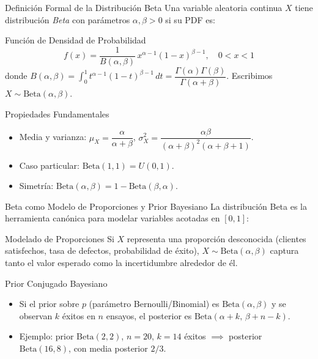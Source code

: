 \documentclass[10pt, aspectratio=169]{beamer}
\begin{document}
\begin{frame}{Definición Formal de la Distribución Beta}
  \footnotesize
  Una variable aleatoria continua $X$ tiene distribución \emph{Beta} con parámetros $\alpha, \beta > 0$ si su PDF es: \pause

  \vspace{0.1cm}
  \begin{block}{Función de Densidad de Probabilidad}
    $$f(x) = \dfrac{1}{B(\alpha,\beta)}\,x^{\alpha-1}(1-x)^{\beta-1}, \quad 0 < x < 1$$
    donde $B(\alpha,\beta) = \int_{0}^{1} t^{\alpha-1}(1-t)^{\beta-1}\,dt = \dfrac{\Gamma(\alpha)\Gamma(\beta)}{\Gamma(\alpha+\beta)}$. Escribimos $X \sim \text{Beta}(\alpha,\beta)$.
  \end{block}

  \vspace{0.1cm}
  \pause
  \begin{alertblock}{Propiedades Fundamentales}
    \begin{itemize}\itemsep=0.05cm
      \item Media y varianza: $\mu_{X} = \dfrac{\alpha}{\alpha+\beta}$, $\sigma_{X}^{2} = \dfrac{\alpha\beta}{(\alpha+\beta)^{2}(\alpha+\beta+1)}$.
      \item Caso particular: $\text{Beta}(1,1) = U(0,1)$.
      \item Simetría: $\text{Beta}(\alpha,\beta) = 1 - \text{Beta}(\beta,\alpha)$.
    \end{itemize}
  \end{alertblock}
\end{frame}

\begin{frame}{Beta como Modelo de Proporciones y Prior Bayesiano}
  \footnotesize
  La distribución Beta es la herramienta canónica para modelar variables acotadas en $[0,1]$: \pause

  \vspace{0.1cm}
  \begin{block}{Modelado de Proporciones}
    Si $X$ representa una proporción desconocida (clientes satisfechos, tasa de defectos, probabilidad de éxito), $X \sim \text{Beta}(\alpha,\beta)$ captura tanto el valor esperado como la incertidumbre alrededor de él.
  \end{block}

  \vspace{0.1cm}
  \pause
  \begin{alertblock}{Prior Conjugado Bayesiano}
    \begin{itemize}\itemsep=0.05cm
      \item Si el prior sobre $p$ (parámetro Bernoulli/Binomial) es $\text{Beta}(\alpha,\beta)$ y se observan $k$ éxitos en $n$ ensayos, el posterior es $\text{Beta}(\alpha+k,\, \beta+n-k)$.
      \item Ejemplo: prior $\text{Beta}(2,2)$, $n=20$, $k=14$ éxitos $\implies$ posterior $\text{Beta}(16,8)$, con media posterior $2/3$.
    \end{itemize}
  \end{alertblock}
\end{frame}
\end{document}
